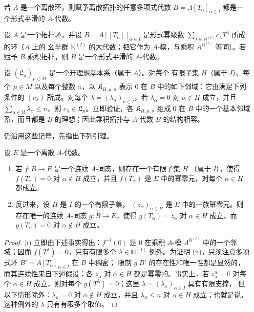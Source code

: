 \begin{corollary}[19.3.3]
\label{0.19.3.3-fr}
若 $A$ 是一个离散环，则赋予离散拓扑的任意多项式代数
$B=A[T_\alpha]_{\alpha\in I}$ 都是一个形式平滑的 $A$-代数。
\end{corollary}

\begin{proposition}[19.3.4]
\label{0.19.3.4-fr}
设 $A$ 是一个拓扑环，并设
$B=A[[T_\alpha]]_{\alpha\in I}$ 是形式幂级数
$\sum_{\lambda\in\mathbb{N}^{(I)}}c_\lambda T^\lambda$ 所成的环（$A$ 上的
幺半群 $\mathbb{N}^{(I)}$ 的大代数；把它作为 $A$-模，与乘积
$A^{\mathbb{N}^{(I)}}$ 等同）。若赋予 $B$ 乘积拓扑，则 $B$ 是一个形式平滑的
$A$-代数。
\end{proposition}

设 $(\mathfrak L_\mu)_{\mu\in M}$ 是一个开理想基本系（属于 $A$）。对每个
有限子集 $H$（属于 $I$）、每个 $\mu\in M$ 以及每个整数 $n$，以
$\mathfrak K_{H,\mu,n}$ 表示 $0$ 在 $B$ 中的如下邻域：它由满足下列条件的
$(c_\lambda)$ 所成。对每个 $\lambda=(\lambda_\alpha)_{\alpha\in I}$，若
$\lambda_\alpha=0$ 对 $\alpha\notin H$ 成立，并且
$\sum_{\alpha\in H}\lambda_\alpha\leq n$，则
$c_\lambda\in\mathfrak L_\mu$。立即验证，各 $\mathfrak K_{H,\mu,n}$ 组成
$0$ 在 $B$ 中的一个基本邻域系，而且都是 $B$ 的理想；因此乘积拓扑与
$A$-代数 $B$ 的结构相容。

仍沿用这些记号，先指出下列引理。
\begin{lemma}[19.3.4.1]
\label{0.19.3.4.1-fr}
设 $E$ 是一个离散 $A$-代数。
\begin{enumerate}
  \item[(i)] 若 $f:B\to E$ 是一个连续 $A$-同态，则存在一个有限子集 $H$
  （属于 $I$），使得 $f(T_\alpha)=0$ 对 $\alpha\notin H$ 成立，并且
  $f(T_\alpha)$ 是 $E$ 中的幂零元，对每个 $\alpha\in H$ 都成立。
  \item[(ii)] 反过来，设 $H$ 是 $I$ 的一个有限子集，
  $(z_\alpha)_{\alpha\in H}$ 是 $E$ 中的一族幂零元。则存在唯一的连续
  $A$-同态 $g:B\to E$，使得 $g(T_\alpha)=z_\alpha$ 对 $\alpha\in H$
  成立，而 $g(T_\alpha)=0$ 对 $\alpha\notin H$ 成立。
\end{enumerate}
\end{lemma}


\begin{proof}
(i) 立即由下述事实得出：$f^{-1}(0)$ 是 $0$ 在乘积 $A$-模
$A^{\mathbb{N}^{(I)}}$ 中的一个邻域；因而 $f(T^\lambda)=0$，只有有限多个
$\lambda\in\mathbb{N}^{(I)}$ 例外。为证明
(ii)，只须注意多项式环 $B'=A[T_\alpha]_{\alpha\in I}$ 在 $B$ 中稠密；
限制 $g|B'$ 的存在性和唯一性都是显然的，而其连续性来自下述假设：各
$z_\alpha$ 对 $\alpha\in H$ 都是幂零的。事实上，若
$z_\alpha^n=0$ 对每个 $\alpha\in H$ 成立，则对每个
$g(T^\lambda)=0$；这里 $\lambda=(\lambda_\alpha)_{\alpha\in I}$ 具有有限支撑，
但以下情形除外：$\lambda_\alpha=0$ 对 $\alpha\notin H$ 成立，并且
$\lambda_\alpha\leq n$ 对 $\alpha\in H$ 成立；也就是说，这种例外的
$\lambda$ 只有有限多个取值。
\end{proof}

